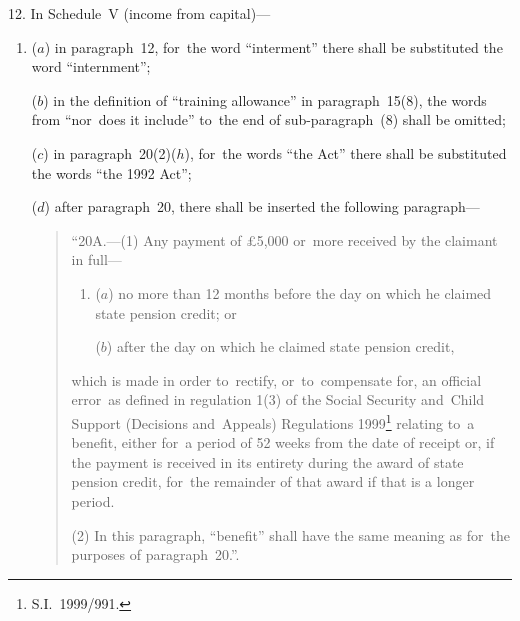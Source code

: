 \documentclass[12pt,a4paper]{article}
\begin{document}
12.  In Schedule~V (income from capital)—
\begin{enumerate}\item[]
($a$) in paragraph~12, for~the word “interment” there shall be substituted the word “internment”;

($b$) in the definition of “training allowance” in paragraph~15(8), the words from “nor~does it include” to~the end of sub-paragraph~(8) shall be omitted;

($c$) in paragraph~20(2)($h$), for~the words “the Act” there shall be substituted the words “the 1992 Act”;

($d$) after paragraph~20, there shall be inserted the following paragraph—
\begin{quotation}
“20A.---(1)  Any payment of £5,000 or~more received by the claimant in full—
\begin{enumerate}\item[]
($a$) no more than 12 months before the day on which he claimed state pension credit; or

($b$) after the day on which he claimed state pension credit,
\end{enumerate}
which is made in order to~rectify, or~to~compensate for, an official error~as defined in regulation 1(3) of the Social Security and~Child Support (Decisions and~Appeals) Regulations 1999\footnote{S.I.~1999/991.} relating to~a benefit, either for~a period of 52 weeks from the date of receipt or, if the payment is received in its entirety during the award of state pension credit, for~the remainder of that award if that is a longer period.

(2) In this paragraph, “benefit” shall have the same meaning as for~the purposes of paragraph~20.”.
\end{quotation}
\end{enumerate}

\medskip
\end{document}
